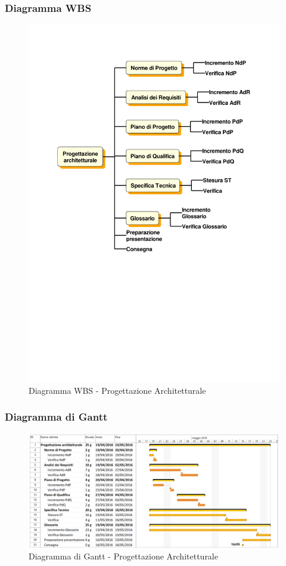 \subsubsection{Diagramma WBS}
\begin{figure}[H]
	\centering
	\includegraphics[width= 15cm]{immagini/pa_wbs.pdf}
	\caption{Diagramma WBS - Progettazione Architetturale}
\end{figure}

\subsubsection{Diagramma di Gantt}
\begin{figure}[H]
	\centering
	\includegraphics[width= 16cm]{immagini/pa_gantt.png}
	\caption{Diagramma di Gantt - Progettazione Architetturale}
\end{figure}
\newpage


